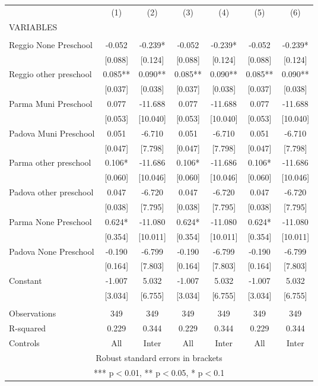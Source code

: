 \begin{tabular}{lcccccc} \hline
 & (1) & (2) & (3) & (4) & (5) & (6) \\
VARIABLES &  &  &  &  &  &  \\ \hline
 &  &  &  &  &  &  \\
Reggio None Preschool & -0.052 & -0.239* & -0.052 & -0.239* & -0.052 & -0.239* \\
 & [0.088] & [0.124] & [0.088] & [0.124] & [0.088] & [0.124] \\
Reggio other preschool & 0.085** & 0.090** & 0.085** & 0.090** & 0.085** & 0.090** \\
 & [0.037] & [0.038] & [0.037] & [0.038] & [0.037] & [0.038] \\
Parma Muni Preschool & 0.077 & -11.688 & 0.077 & -11.688 & 0.077 & -11.688 \\
 & [0.053] & [10.040] & [0.053] & [10.040] & [0.053] & [10.040] \\
Padova Muni Preschool & 0.051 & -6.710 & 0.051 & -6.710 & 0.051 & -6.710 \\
 & [0.047] & [7.798] & [0.047] & [7.798] & [0.047] & [7.798] \\
Parma other preschool & 0.106* & -11.686 & 0.106* & -11.686 & 0.106* & -11.686 \\
 & [0.060] & [10.046] & [0.060] & [10.046] & [0.060] & [10.046] \\
Padova other preschool & 0.047 & -6.720 & 0.047 & -6.720 & 0.047 & -6.720 \\
 & [0.038] & [7.795] & [0.038] & [7.795] & [0.038] & [7.795] \\
Parma None Preschool & 0.624* & -11.080 & 0.624* & -11.080 & 0.624* & -11.080 \\
 & [0.354] & [10.011] & [0.354] & [10.011] & [0.354] & [10.011] \\
Padova None Preschool & -0.190 & -6.799 & -0.190 & -6.799 & -0.190 & -6.799 \\
 & [0.164] & [7.803] & [0.164] & [7.803] & [0.164] & [7.803] \\
Constant & -1.007 & 5.032 & -1.007 & 5.032 & -1.007 & 5.032 \\
 & [3.034] & [6.755] & [3.034] & [6.755] & [3.034] & [6.755] \\
 &  &  &  &  &  &  \\
Observations & 349 & 349 & 349 & 349 & 349 & 349 \\
R-squared & 0.229 & 0.344 & 0.229 & 0.344 & 0.229 & 0.344 \\
 Controls & All & Inter & All & Inter & All & Inter \\ \hline
\multicolumn{7}{c}{ Robust standard errors in brackets} \\
\multicolumn{7}{c}{ *** p$<$0.01, ** p$<$0.05, * p$<$0.1} \\
\end{tabular}
